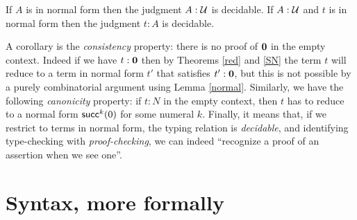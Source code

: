 \begin{thm}
If $A$ is in normal form then the 
judgment $A : \mathcal{U}$ is decidable. If $A : \mathcal{U}$ and $t$ is in normal form then the judgment
$t:A$ is decidable.
\end{thm}


 A corollary is the {\em consistency} property: there is no proof of $\mathbf{0}$ in the empty
context. Indeed if we have $t:\mathbf{0}$ then by Theorems \ref{red} and \ref{SN} the term $t$ will reduce
to a term in normal form $t'$ that satisfies $t':\mathbf{0}$, but this is not possible by a 
purely combinatorial argument using Lemma \ref{normal}. Similarly, we have the following
{\em canonicity} property: if $t:N$ in the empty context, then $t$ has to reduce to a
normal form $\mathsf{succ}^k(0)$ for some numeral $k$. Finally, it means that, if we restrict to terms
in normal form, the typing relation is {\em decidable}, and identifying type-checking with
{\em proof-checking}, we can indeed ``recognize a proof of an assertion when we see one''.

\egroup

\section{Syntax, more formally}

\bgroup %

\newcommand{\oftype}{\mathord{:}}
\newcommand{\types}{\vdash}
\newcommand{\myType}{\textsf{ type}} %
\newcommand{\ctx}{\textsf{ctx}}
\newcommand{\emptyctx}{[\ ]}
\newcommand{\form}{\textsc{form}}
\newcommand{\intro}{\textsc{intro}}
\newcommand{\appRule}{\textsc{app}}
\newcommand{\elim}{\textsc{elim}}
\newcommand{\comp}{\textsc{comp}}
\newcommand{\Weak}{\mathsf{Wkg}}
\newcommand{\Vble}{\mathsf{Vble}}
\newcommand{\Exch}{\mathsf{Exch}}
\newcommand{\Subst}{\mathsf{Subst}}
\newcommand{\synId}{\mathsf{Id}}
\newcommand{\synPi}{\mathsf{\Pi}}
\newcommand{\synSigma}{\mathsf{\Sigma}}
\newcommand{\synW}{\mathsf{W}}
\newcommand{\synOne}{\mathsf{1}}
\newcommand{\synZero}{\mathsf{0}}
\newcommand{\synPlus}{+}
\newcommand{\synU}{\mathsf{U}}
\newcommand{\el}{\mathsf{El}}
\newcommand{\synrefl}{\mathsf{refl}}
\newcommand{\synlambda}{\mathsf{\lambda}}
\newcommand{\myRefl}{\mathsf{refl}} %
\newcommand{\synsup}{\mathsf{sup}}
\newcommand{\synz}{\mathsf{z}}
\newcommand{\syno}{\mathsf{o}}
\newcommand{\synw}{\mathsf{w}}
\newcommand{\synpi}{\boldsymbol{\pi}}
\newcommand{\synsigma}{\boldsymbol{\sigma}}
\newcommand{\synid}{\mathsf{id}}

